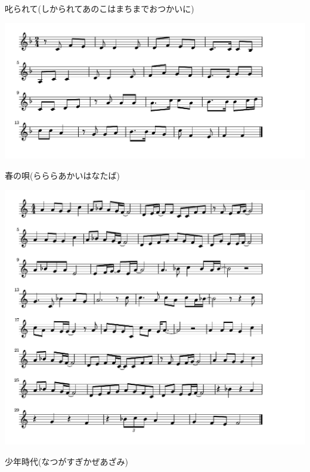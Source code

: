 \documentclass[a4paper]{ltjsarticle}
\begin{document}
\vspace{-10mm} \hspace{10mm}
叱られて(しかられてあのこはまちまでおつかいに)

\includegraphics[clip]{harunouta_crop.pdf}

\vspace{-10mm} \hspace{10mm}
春の唄(らららあかいはなたば)

\includegraphics[clip]{shonenjidai_crop.pdf}

\vspace{-10mm} \hspace{10mm}
少年時代(なつがすぎかぜあざみ)
\end{document}
